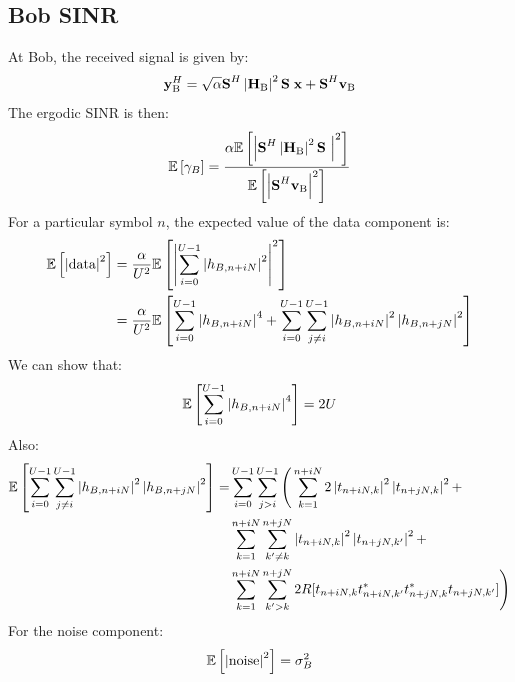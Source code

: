\documentclass[12pt]{article}
\begin{document}
\subsection{Bob SINR}
At Bob, the received signal is given by:
\begin{equation}
\textbf{y}_{\text{B}}^H = \sqrt{\alpha}\textbf{S}^H  \left|\textbf{H}_{\text{B}}\right|^2\textbf{S}\; \textbf{x} +  \textbf{S}^H \textbf{v}_\text{B} 
\label{eq:rx_bob}
\end{equation}
The ergodic SINR is then:
\begin{equation}
	\mathbb{E} \left[\gamma_B\right] = \frac{\alpha\mathbb{E} \left[\left| \textbf{S}^H  \left|\textbf{H}_{\text{B}}\right|^2\textbf{S}\ \right|^2\right]}{ \mathbb{E} \left[\left|  \textbf{S}^H \textbf{v}_\text{B}\right|^2\right]}
	\label{eq:expected_sinrb}
\end{equation}
For a particular symbol $n$, the expected value of the data component is:
\begin{equation}
\begin{split}
\mathbb{E} \left[\left| \text{data}\right|^2\right] &=  \frac{\alpha}{U^2} \mathbb{E} \left[\left|\sum_{i=0}^{U-1} \left|h_{B,n+iN}\right|^2\right|^2\right] \\
&=  \frac{\alpha}{U^2} \mathbb{E} \left[\sum_{i=0}^{U-1} \left|h_{B,n+iN}\right|^4  + \sum_{i=0}^{U-1}\sum_{j \neq i}^{U-1} \left|h_{B,n+iN}\right|^2  \left|h_{B,n+jN}\right|^2 \right]
\label{eq:data_b_determination}
\end{split}
\end{equation}
We can show that:
\begin{equation}
	 \mathbb{E} \left[\sum_{i=0}^{U-1} \left|h_{B,n+iN}\right|^4\right] = 2U
	 \label{eq:data_b_determination_1}
\end{equation}
Also:
\begin{equation}
\begin{split}
\mathbb{E} \left[\sum_{i=0}^{U-1}\sum_{j \neq i}^{U-1} \left|h_{B,n+iN}\right|^2  \left|h_{B,n+jN}\right|^2\right] =& \sum_{i=0}^{U-1} \sum_{j>i}^{U-1} \Bigg(\sum_{k=1}^{n+iN} 2 \left|t_{n+iN,k}\right|^2   \left|t_{n+jN,k}\right|^2 + \\
& \sum_{k=1}^{n+iN} \sum_{k'\neq k}^{n+jN} \left|t_{n+iN,k}\right|^2   \left|t_{n+jN,k'}\right|^2 +\\
& \sum_{k=1}^{n+iN} \sum_{k'>k}^{n+jN} 2 R [ t_{n+iN,k} t_{n+iN,k'}^* t_{n+jN,k}^* t_{n+jN,k'}] \Bigg)
\label{eq:data_b_determination_2}
\end{split}
\end{equation}
For the noise component: 
\begin{equation}
	\mathbb{E} \left[\left| \text{noise}\right|^2\right] = \sigma^2_{B}
	\label{eq:noise_b_determination}
\end{equation}
\end{document}
